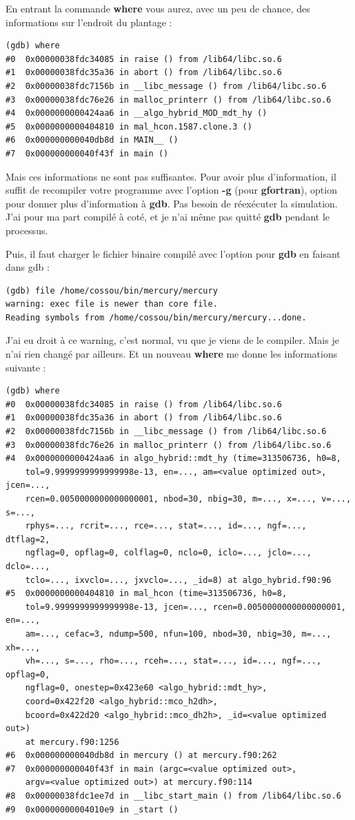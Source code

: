 \documentclass[a4paper,twoside]{article}
\begin{document}
En entrant la commande \textbf{where} vous aurez, avec un peu de chance, des informations sur l'endroit du plantage :
\begin{verbatim}
(gdb) where
#0  0x00000038fdc34085 in raise () from /lib64/libc.so.6
#1  0x00000038fdc35a36 in abort () from /lib64/libc.so.6
#2  0x00000038fdc7156b in __libc_message () from /lib64/libc.so.6
#3  0x00000038fdc76e26 in malloc_printerr () from /lib64/libc.so.6
#4  0x0000000000424aa6 in __algo_hybrid_MOD_mdt_hy ()
#5  0x0000000000404810 in mal_hcon.1587.clone.3 ()
#6  0x000000000040db8d in MAIN__ ()
#7  0x000000000040f43f in main ()
\end{verbatim}

Mais ces informations ne sont pas suffisantes. Pour avoir plus d'information, il suffit de recompiler votre programme avec l'option \textbf{-g} (pour \textbf{gfortran}), option pour donner plus d'information à \textbf{gdb}. Pas besoin de réexécuter la simulation. J'ai pour ma part compilé à coté, et je n'ai même pas quitté \textbf{gdb} pendant le processus. 

Puis, il faut charger le fichier binaire compilé avec l'option pour \textbf{gdb} en faisant dans gdb :
\begin{verbatim}
(gdb) file /home/cossou/bin/mercury/mercury
warning: exec file is newer than core file.
Reading symbols from /home/cossou/bin/mercury/mercury...done.
\end{verbatim}
J'ai eu droit à ce warning, c'est normal, vu que je viens de le compiler. Mais je n'ai rien changé par ailleurs. Et un nouveau \textbf{where} me donne les informations suivante :
\begin{verbatim}
(gdb) where
#0  0x00000038fdc34085 in raise () from /lib64/libc.so.6
#1  0x00000038fdc35a36 in abort () from /lib64/libc.so.6
#2  0x00000038fdc7156b in __libc_message () from /lib64/libc.so.6
#3  0x00000038fdc76e26 in malloc_printerr () from /lib64/libc.so.6
#4  0x0000000000424aa6 in algo_hybrid::mdt_hy (time=313506736, h0=8, 
    tol=9.9999999999999998e-13, en=..., am=<value optimized out>, jcen=..., 
    rcen=0.0050000000000000001, nbod=30, nbig=30, m=..., x=..., v=..., s=..., 
    rphys=..., rcrit=..., rce=..., stat=..., id=..., ngf=..., dtflag=2, 
    ngflag=0, opflag=0, colflag=0, nclo=0, iclo=..., jclo=..., dclo=..., 
    tclo=..., ixvclo=..., jxvclo=..., _id=8) at algo_hybrid.f90:96
#5  0x0000000000404810 in mal_hcon (time=313506736, h0=8, 
    tol=9.9999999999999998e-13, jcen=..., rcen=0.0050000000000000001, en=..., 
    am=..., cefac=3, ndump=500, nfun=100, nbod=30, nbig=30, m=..., xh=..., 
    vh=..., s=..., rho=..., rceh=..., stat=..., id=..., ngf=..., opflag=0, 
    ngflag=0, onestep=0x423e60 <algo_hybrid::mdt_hy>, 
    coord=0x422f20 <algo_hybrid::mco_h2dh>, 
    bcoord=0x422d20 <algo_hybrid::mco_dh2h>, _id=<value optimized out>)
    at mercury.f90:1256
#6  0x000000000040db8d in mercury () at mercury.f90:262
#7  0x000000000040f43f in main (argc=<value optimized out>, 
    argv=<value optimized out>) at mercury.f90:114
#8  0x00000038fdc1ee7d in __libc_start_main () from /lib64/libc.so.6
#9  0x00000000004010e9 in _start ()
\end{verbatim}
\end{document}
